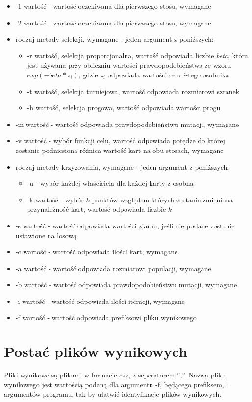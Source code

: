 \documentclass[12pt]{article}
\begin{document}
\begin{itemize}
	\item{-1 wartość - wartość oczekiwana dla pierwszego stosu, wymagane}
	\item{-2 wartość - wartość oczekiwana dla pierwszego stosu, wymagane}
	\item{rodzaj metody selekcji, wymagane - jeden argument z poniższych: 
		\begin{itemize}
			\item{-r wartość, selekcja proporcjonalna, wartość odpowiada liczbie \textit{beta}, która jest używana przy obliczniu wartości prawdopodobieństwa ze wzoru $exp(-beta*z_i)$, gdzie $z_i$ odpowiada wartości celu $i$-tego osobnika}
			\item{-t wartość, selekcja turniejowa, wartość odpowiada rozmiarowi szranek}
			\item{-h wartość, selekcja progowa, wartość odpowiada wartości progu}
		\end{itemize}
		}
	\item{-m wartość - wartość odpowiada prawdopodobieństwu mutacji, wymagane}
	\item{-v wartość - wybór funkcji celu, wartość odpowiada potędze do której zostanie podniesiona różnica wartość kart na obu stosach, wymagane }
	\item{rodzaj metody krzyżowania, wymagane - jeden argument z poniższych:
		\begin{itemize}
			\item{-u - wybór każdej właściciela dla każdej karty z osobna}
			\item{-k wartość - wybór $k$ punktów względem których zostanie zmieniona przynależność kart, wartość odpowiada liczbie $k$} 
		\end{itemize}
		}
	\item{-s wartość - wartość odpowiada wartości ziarna, jeśli nie podane zostanie ustawione na losową}
	\item{-c wartość - wartość odpowiada ilości kart, wymagane}
	\item{-a wartość - wartość odpowiada rozmiarowi populacji, wymagane}
	\item{-b wartość - wartość odpowiada prawdopodobieństwu mutacji, wymagane }
	\item{-i wartość - wartość odpowiada ilości iteracji, wymagane }
	\item{-f wartość - wartość odpowiada prefiksowi pliku wynikowego}
\end{itemize}

\section{Postać plików wynikowych}
Pliki wynikowe są plikami w formacie csv, z seperatorem '',''. Nazwa pliku wynikowego jest wartością podaną dla argumentu -f, będącego prefiksem, i argumentów programu, tak by ułatwić identyfikacje plików wynikowych. \\
\end{document}
